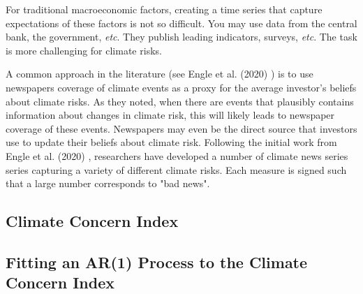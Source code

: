 For traditional macroeconomic factors, 
creating a time series that capture expectations 
of these factors is not so difficult. You may 
use data from the central bank, the government,
\textit{etc}. They publish leading indicators,
surveys, \textit{etc}. The task is more 
challenging for climate risks.

A common approach in the literature (see Engle et al. (2020) \cite{engle2020hedging})
is to use newspapers coverage of climate events as a proxy 
for the average investor's beliefs about climate risks.
As they noted, when there are events that plausibly
contains information about changes in climate risk,
this will likely leads to newspaper coverage of these events.
Newspapers may even be the direct source that investors
use to update their beliefs about climate risk.
Following the initial work from Engle et al. (2020) \cite{engle2020hedging},
researchers have developed a number of climate 
news series series capturing a variety of different climate risks.
Each measure is signed such that a large number 
corresponds to "bad news".



\subsection{Climate Concern Index}

\subsection{Fitting an AR(1) Process
to the Climate Concern Index}


